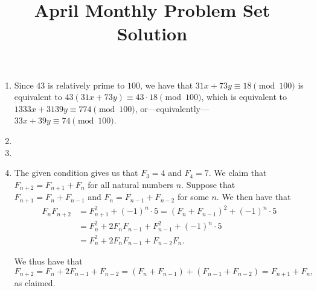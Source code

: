 \documentclass[12pt]{article}
\title{April Monthly Problem Set Solution}
\author{\vspace{-24pt}}
\date{\vspace{-24pt}}
\begin{document}
 \maketitle \pagestyle{empty}

\begin{enumerate}

\item %
Since $43$ is relatively prime to $100$, we have that $31x + 73y \equiv 18
\pmod{100}$ is equivalent to $43(31x + 73y) \equiv 43 \cdot 18 \pmod{100}$,
which is equivalent to $1333x + 3139y \equiv 774 \pmod{100}$,
or---equivalently---$33x + 39y \equiv 74 \pmod{100}$.

\item %


\item %


\item %
The given condition gives us that $F_3 = 4$ and $F_4 = 7$. We claim that $F_{n +
2} = F_{n + 1} + F_{n}$ for all natural numbers $n$. Suppose that $F_{n + 1} =
F_{n} + F_{n - 1}$ and $F_n = F_{n - 1} + F_{n - 2}$ for some $n$. We then have
that
\begin{align*}
  F_{n} F_{n + 2} & = F_{n + 1}^2 + {(-1)}^{n} \cdot 5 
     = {\left(F_n + F_{n - 1}\right)}^2 + {(-1)}^{n} \cdot 5 \\
     & = F_n^2 + 2 F_n F_{n-1} + F_{n - 1}^2 + {(-1)}^{n} \cdot 5 \\
     & = F_n^2 + 2F_n F_{n-1} + F_{n - 2} F_n. 
\end{align*}

We thus have that
\[
    F_{n + 2} = F_n + 2F_{n - 1} + F_{n - 2} = (F_n + F_{n - 1}) + (F_{n - 1} +
    F_{n - 2}) = F_{n + 1} + F_n,
\]
as claimed.


\end{enumerate}
\end{document}
